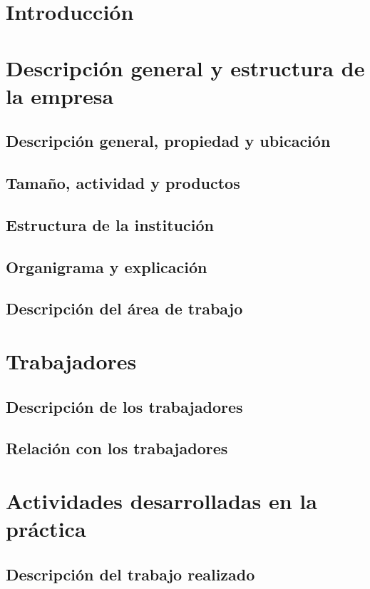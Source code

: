 \section{Introducción}

\section{Descripción general y estructura de la empresa}
\subsection{Descripción general, propiedad y ubicación}
\subsection{Tamaño, actividad y productos}
\subsection{Estructura de la institución}
\subsection{Organigrama y explicación}
\subsection{Descripción del área de trabajo}

\section{Trabajadores}
\subsection{Descripción de los trabajadores}
\subsection{Relación con los trabajadores}

\section{Actividades desarrolladas en la práctica}
\subsection{Descripción del trabajo realizado}
